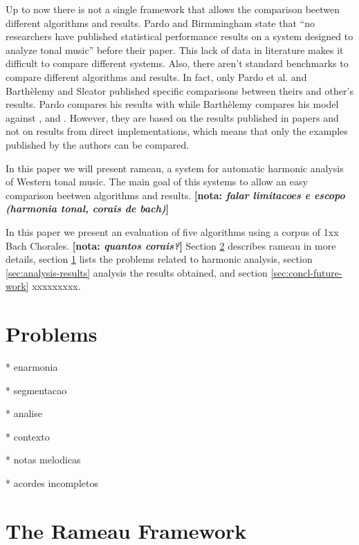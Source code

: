 \documentclass{article}
\newcommand{\nota}[1]{
  \textbf{[nota: \textit{#1}]}
}
\begin{document}

Up to now there is not a single framework that allows the comparison
beetwen different algorithms and results. Pardo and Birmmingham state
that ``no researchers have published statistical performance results
on a system designed to analyze tonal music''
\cite{pardo02:algorithms} before their paper. This lack of data in
literature makes it difficult to compare different systems. Also,
there aren't standard benchmarks to compare different algorithms and
results. In fact, only Pardo et al. \cite{pardo00:automated} and
Barthèlemy and Sleator \cite{barthelemy01:figured} published specific
comparisons between theirs and other's results. Pardo compares his
results with \cite{temperley99:modeling} while Barthèlemy compares his
model against \cite{maxwell92:expert}, \cite{pardo99:automated} and
\cite{temperley96:algorithm}. However, they are based on the results
published in papers and not on results from direct implementations,
which means that only the examples published by the authors can be
compared.

In this paper we will present rameau, a system for automatic harmonic
analysis of Western tonal music. The main goal of this systems to
allow an easy comparison beetwen algorithms and results. \nota{falar
  limitacoes e escopo (harmonia tonal, corais de bach)}

In this paper we present an evaluation of five algorithms using a
corpus of 1xx Bach Chorales. \nota{quantos corais?} Section
\ref{sec:system} describes rameau in more details, section
\ref{sec:problems} lists the problems related to harmonic analysis,
section \ref{sec:analysis-results} analysis the results obtained, and
section \ref{sec:concl-future-work} xxxxxxxxx.

\section{Problems}
\label{sec:problems}

* enarmonia

* segmentacao

* analise

* contexto

* notas melodicas

* acordes incompletos


\section{The Rameau Framework}
\label{sec:system}
\end{document}
